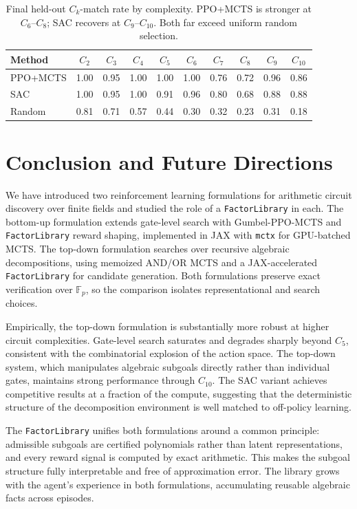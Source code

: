 \documentclass{article}
\theoremstyle{definition}
\theoremstyle{remark}
\begin{document}
\begin{table}[t]
\centering
\caption{Final held-out \(C_k\)-match rate by complexity. PPO+MCTS is stronger at $C_6$--$C_8$; SAC recovers at $C_9$--$C_{10}$. Both far exceed uniform random selection.}
\label{tab:topdown-per-ck}
\small
\setlength{\tabcolsep}{5pt}
\begin{tabular}{@{}lccccccccc@{}}
\toprule
Method & \(C_2\) & \(C_3\) & \(C_4\) & \(C_5\) & \(C_6\) & \(C_7\) & \(C_8\) & \(C_9\) & \(C_{10}\) \\
\midrule
PPO+MCTS & 1.00 & 0.95 & 1.00 & 1.00 & 1.00 & 0.76 & 0.72 & 0.96 & 0.86 \\
SAC      & 1.00 & 0.95 & 1.00 & 0.91 & 0.96 & 0.80 & 0.68 & 0.88 & 0.88 \\
Random   & 0.81 & 0.71 & 0.57 & 0.44 & 0.30 & 0.32 & 0.23 & 0.31 & 0.18 \\
\bottomrule
\end{tabular}
\end{table}

\section{Conclusion and Future Directions}

We have introduced two reinforcement learning formulations for arithmetic circuit discovery over finite fields and studied the role of a \texttt{FactorLibrary} in each. The bottom-up formulation extends gate-level search with Gumbel-PPO-MCTS and \texttt{FactorLibrary} reward shaping, implemented in JAX with \texttt{mctx} for GPU-batched MCTS. The top-down formulation searches over recursive algebraic decompositions, using memoized AND/OR MCTS and a JAX-accelerated \texttt{FactorLibrary} for candidate generation. Both formulations preserve exact verification over $\mathbb{F}_p$, so the comparison isolates representational and search choices.

Empirically, the top-down formulation is substantially more robust at higher circuit complexities. Gate-level search saturates and degrades sharply beyond $C_5$, consistent with the combinatorial explosion of the action space. The top-down system, which manipulates algebraic subgoals directly rather than individual gates, maintains strong performance through $C_{10}$. The SAC variant achieves competitive results at a fraction of the compute, suggesting that the deterministic structure of the decomposition environment is well matched to off-policy learning.

The \texttt{FactorLibrary} unifies both formulations around a common principle: admissible subgoals are certified polynomials rather than latent representations, and every reward signal is computed by exact arithmetic. This makes the subgoal structure fully interpretable and free of approximation error. The library grows with the agent's experience in both formulations, accumulating reusable algebraic facts across episodes.
\end{document}
